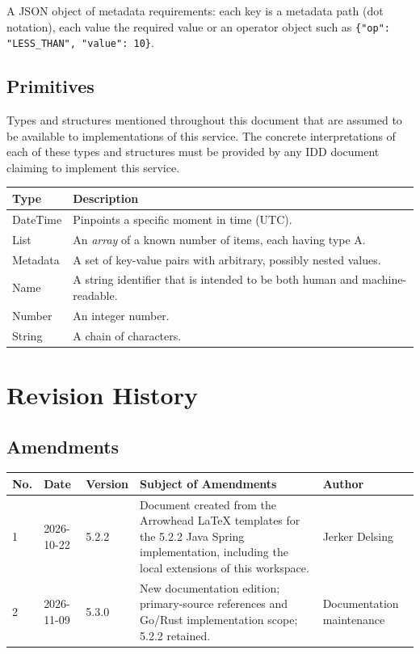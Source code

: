 \documentclass[a4paper]{arrowhead}
\newcommand{\pdef}[1]{{\textcolor{ArrowheadGrey}{#1\label{sec:model:primitives:#1}\label{sec:model:primitives:#1s}\label{sec:model:primitives:#1es}}}}
\begin{document}

A JSON object of metadata requirements: each key is a metadata path (dot notation), each value the required value or an operator object such as \texttt{\{"op": "LESS\_\allowbreak{}THAN",\allowbreak{} "value": 10\}}.



\subsection{Primitives}
\label{sec:model:primitives}

Types and structures mentioned throughout this document that are assumed to be available to implementations of this service.
The concrete interpretations of each of these types and structures must be provided by any IDD document claiming to implement this service.

\noindent\begin{tabularx}{\textwidth}{| p{4.6cm} | X |} \hline
\rowcolor{gray!33} Type & Description \\ \hline
\pdef{DateTime} & Pinpoints a specific moment in time (UTC). \\ \hline
\pdef{List} & An \textit{array} of a known number of items, each having type A. \\ \hline
\pdef{Metadata} & A set of key-value pairs with arbitrary, possibly nested values. \\ \hline
\pdef{Name} & A string identifier that is intended to be both human and machine-readable. \\ \hline
\pdef{Number} & An integer number. \\ \hline
\pdef{String} & A chain of characters. \\ \hline
\end{tabularx}

\newpage




\newpage

\section{Revision History}
\subsection{Amendments}

\noindent\begin{tabularx}{\textwidth}{| p{1cm} | p{3cm} | p{2cm} | X | p{4cm} |} \hline
\rowcolor{gray!33} No. & Date & Version & Subject of Amendments & Author \\ \hline

1 & 2026-10-22 & 5.2.2 & Document created from the Arrowhead LaTeX templates for the 5.2.2 Java Spring implementation, including the local extensions of this workspace. & Jerker Delsing \\ \hline
2 & 2026-11-09 & 5.3.0 & New documentation edition; primary-source references and Go/Rust implementation scope; 5.2.2 retained. & Documentation maintenance \\ \hline
\end{tabularx}
\end{document}
